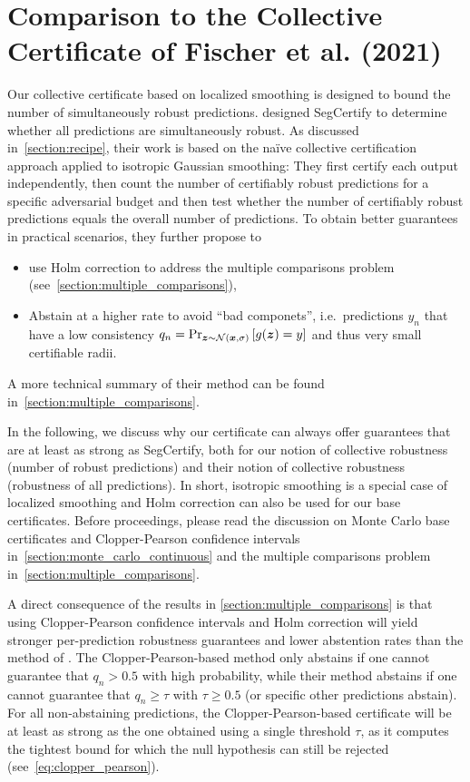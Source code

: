 \section{Comparison to the Collective Certificate of Fischer et al. (2021)}\label{section:fischer_comparison}
Our collective certificate based on localized smoothing is designed to bound the number of simultaneously robust predictions.
\citet{Fischer2021} designed SegCertify to determine whether all predictions are simultaneously robust.
As discussed in~\autoref{section:recipe}, their work is based on the na\"ive collective certification approach applied to isotropic Gaussian smoothing:
They first certify each output independently, then count the number of certifiably robust predictions for a specific adversarial budget and then test whether the number of certifiably robust predictions equals the overall number of predictions.
To obtain better guarantees in practical scenarios, they further propose to
\begin{itemize}
    \item use Holm correction to address the multiple comparisons problem (see~\autoref{section:multiple_comparisons}),
    \item Abstain at a higher rate to avoid ``bad componets'', i.e.\ predictions $y_n$ that have a low consistency $q_n = \Pr_{{\bm{z}} \sim \mathcal{N}({\bm{x}},\sigma)}\left[g({\bm{z}}) = y\right]$ and thus very small certifiable radii.
\end{itemize}
A more technical summary of their method can be found in~\autoref{section:multiple_comparisons}.

In the following, we discuss why our certificate can always offer guarantees that are at least as strong as SegCertify,
both for our notion of collective robustness (number of robust predictions) and their notion of collective robustness (robustness of all predictions).
In short, isotropic smoothing is a special case of localized smoothing and Holm correction can also be used for our base certificates.
Before proceedings, please read the discussion on Monte Carlo base certificates and Clopper-Pearson confidence intervals in~\autoref{section:monte_carlo_continuous} and the multiple comparisons problem in~\autoref{section:multiple_comparisons}.

A direct consequence of the results in \autoref{section:multiple_comparisons} is that using Clopper-Pearson confidence intervals and Holm correction will yield stronger per-prediction robustness guarantees and lower abstention rates than the method of \citet{Fischer2021}.
The Clopper-Pearson-based method only abstains if one cannot guarantee that $q_n > 0.5$ with high probability, while their method abstains if
one cannot guarantee that $q_n \geq \tau$ with $\tau \geq 0.5$ (or specific other predictions abstain).
For all non-abstaining predictions, the Clopper-Pearson-based certificate will be at least as strong as the one obtained using a single threshold $\tau$, as it computes the tightest bound for which the null hypothesis can still be rejected (see~\autoref{eq:clopper_pearson}).


